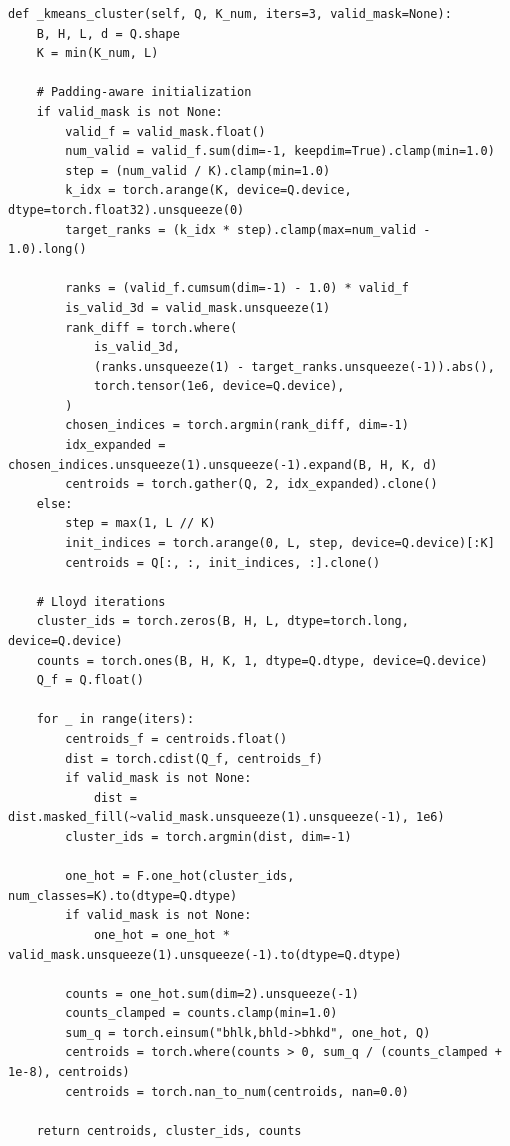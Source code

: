\begin{lstlisting}
def _kmeans_cluster(self, Q, K_num, iters=3, valid_mask=None):
    B, H, L, d = Q.shape
    K = min(K_num, L)
    
    # Padding-aware initialization
    if valid_mask is not None:
        valid_f = valid_mask.float()
        num_valid = valid_f.sum(dim=-1, keepdim=True).clamp(min=1.0)
        step = (num_valid / K).clamp(min=1.0)
        k_idx = torch.arange(K, device=Q.device, dtype=torch.float32).unsqueeze(0)
        target_ranks = (k_idx * step).clamp(max=num_valid - 1.0).long()
        
        ranks = (valid_f.cumsum(dim=-1) - 1.0) * valid_f
        is_valid_3d = valid_mask.unsqueeze(1)
        rank_diff = torch.where(
            is_valid_3d,
            (ranks.unsqueeze(1) - target_ranks.unsqueeze(-1)).abs(),
            torch.tensor(1e6, device=Q.device),
        )
        chosen_indices = torch.argmin(rank_diff, dim=-1)
        idx_expanded = chosen_indices.unsqueeze(1).unsqueeze(-1).expand(B, H, K, d)
        centroids = torch.gather(Q, 2, idx_expanded).clone()
    else:
        step = max(1, L // K)
        init_indices = torch.arange(0, L, step, device=Q.device)[:K]
        centroids = Q[:, :, init_indices, :].clone()
    
    # Lloyd iterations
    cluster_ids = torch.zeros(B, H, L, dtype=torch.long, device=Q.device)
    counts = torch.ones(B, H, K, 1, dtype=Q.dtype, device=Q.device)
    Q_f = Q.float()
    
    for _ in range(iters):
        centroids_f = centroids.float()
        dist = torch.cdist(Q_f, centroids_f)
        if valid_mask is not None:
            dist = dist.masked_fill(~valid_mask.unsqueeze(1).unsqueeze(-1), 1e6)
        cluster_ids = torch.argmin(dist, dim=-1)
        
        one_hot = F.one_hot(cluster_ids, num_classes=K).to(dtype=Q.dtype)
        if valid_mask is not None:
            one_hot = one_hot * valid_mask.unsqueeze(1).unsqueeze(-1).to(dtype=Q.dtype)
        
        counts = one_hot.sum(dim=2).unsqueeze(-1)
        counts_clamped = counts.clamp(min=1.0)
        sum_q = torch.einsum("bhlk,bhld->bhkd", one_hot, Q)
        centroids = torch.where(counts > 0, sum_q / (counts_clamped + 1e-8), centroids)
        centroids = torch.nan_to_num(centroids, nan=0.0)
    
    return centroids, cluster_ids, counts
\end{lstlisting}

